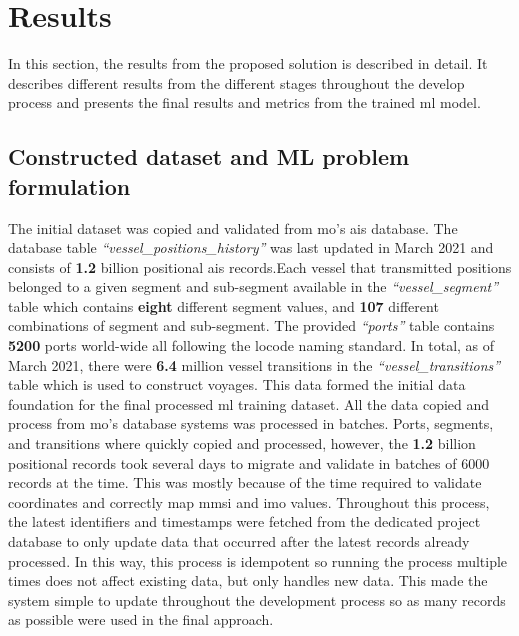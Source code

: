 \chapter{Results}
\label{chap:results}

In this section, the results from the proposed solution is described in detail. It describes different results from the different stages throughout the develop process and presents the final results and metrics from the trained \acrfull{ml} model.

\section{Constructed dataset and ML problem formulation}

The initial dataset was copied and validated from \acrfull{mo}'s \acrshort{ais} database. The database table \textit{``vessel\_positions\_history''} was last updated in March 2021 and consists of \textbf{1.2} billion positional \acrshort{ais} records.Each vessel that transmitted positions belonged to a given segment and sub-segment available in the \textit{``vessel\_segment''} table which contains \textbf{eight} different segment values, and \textbf{107} different combinations of segment and sub-segment. The provided \textit{``ports''} table contains \textbf{5200} ports world-wide all following the \gls{locode} naming standard. In total, as of March 2021, there were \textbf{6.4} million vessel transitions in the \textit{``vessel\_transitions''} table which is used to construct voyages. This data formed the initial data foundation for the final processed \acrfull{ml} training dataset. All the data copied and process from \acrshort{mo}'s database systems was processed in batches. Ports, segments, and transitions where quickly copied and processed, however, the \textbf{1.2} billion positional records took several days to migrate and validate in batches of 6000 records at the time. This was mostly because of the time required to validate coordinates and correctly map \acrshort{mmsi} and \acrshort{imo} values. Throughout this process, the latest identifiers and timestamps were fetched from the dedicated project database to only update data that occurred after the latest records already processed. In this way, this process is idempotent so running the process multiple times does not affect existing data, but only handles new data. This made the system simple to update throughout the development process so as many records as possible were used in the final approach.

